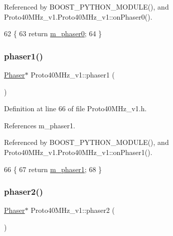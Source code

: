 Referenced by B\+O\+O\+S\+T\+\_\+\+P\+Y\+T\+H\+O\+N\+\_\+\+M\+O\+D\+U\+L\+E(), and Proto40\+M\+Hz\+\_\+v1.\+Proto40\+M\+Hz\+\_\+v1\+::on\+Phaser0().


\begin{DoxyCode}
62                    \{
63     \textcolor{keywordflow}{return} \hyperlink{classProto40MHz__v1_a4464d318fb4a546bd855b46f403deb2a}{m\_phaser0};
64   \}
\end{DoxyCode}
\mbox{\label{classProto40MHz__v1_a9c4ef3187b86b74b05bdec3c167a405e}} 
\subsubsection{\texorpdfstring{phaser1()}{phaser1()}}
{\footnotesize\ttfamily \hyperlink{classPhaser}{Phaser}$\ast$ Proto40\+M\+Hz\+\_\+v1\+::phaser1 (\begin{DoxyParamCaption}{ }\end{DoxyParamCaption})\hspace{0.3cm}{\ttfamily [inline]}}



Definition at line 66 of file Proto40\+M\+Hz\+\_\+v1.\+h.



References m\+\_\+phaser1.



Referenced by B\+O\+O\+S\+T\+\_\+\+P\+Y\+T\+H\+O\+N\+\_\+\+M\+O\+D\+U\+L\+E(), and Proto40\+M\+Hz\+\_\+v1.\+Proto40\+M\+Hz\+\_\+v1\+::on\+Phaser1().


\begin{DoxyCode}
66                    \{
67     \textcolor{keywordflow}{return} \hyperlink{classProto40MHz__v1_abb2d522883488411af268ca1435d8189}{m\_phaser1};
68   \}
\end{DoxyCode}
\mbox{\label{classProto40MHz__v1_a59defd14376765f7df8f87d594170527}} 
\subsubsection{\texorpdfstring{phaser2()}{phaser2()}}
{\footnotesize\ttfamily \hyperlink{classPhaser}{Phaser}$\ast$ Proto40\+M\+Hz\+\_\+v1\+::phaser2 (\begin{DoxyParamCaption}{ }\end{DoxyParamCaption})\hspace{0.3cm}{\ttfamily [inline]}}



